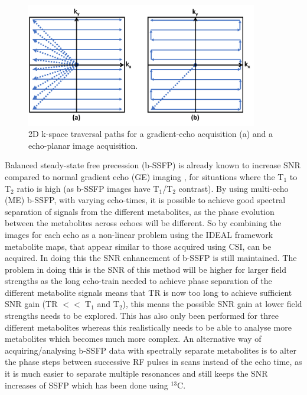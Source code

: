 \documentclass[class=article, crop=false]{standalone}
\begin{document}
\begin{figure}
    \centering
    \includegraphics[width=0.9\textwidth]{Figures/Theory/kspace.png}
    \caption{2D k-space traversal paths for a gradient-echo acquisition (a) and a echo-planar image acquisition.}
    \label{fig:theory:kspace}
\end{figure}

Balanced steady-state free precession\cite{Carr1954EffectsExperiments} (b-SSFP) is already known to increase SNR compared to normal gradient echo (GE) imaging \cite{Bieri2013FundamentalsMRI}, for situations where the T$_1$ to T$_2$ ratio is high (as b-SSFP images have T$_1$/T$_2$ contrast). By using multi-echo (ME) b-SSFP, with varying echo-times, it is possible to achieve good spectral separation of signals from the different metabolites, as the phase evolution between the metabolites across echoes will be different. So by combining the images for each echo as a non-linear problem using the IDEAL framework\cite{Reeder2007Water-fatImaging} metabolite maps, that appear similar to those acquired using CSI, can be acquired. In doing this the SNR enhancement of b-SSFP is still maintained\cite{Peters2021ImprovingInvestigation}. The problem in doing this is the SNR of this method will be higher for larger field strengths as the long echo-train needed to achieve phase separation of the different metabolite signals means that TR is now too long to achieve sufficient SNR gain (TR $<<$ T$_1$ and T$_2$), this means the possible SNR gain at lower field strengths needs to be explored. This has also only been performed for three different metabolites whereas this realistically needs to be able to analyse more metabolites which becomes much more complex. An alternative way of acquiring/analysing b-SSFP data with spectrally separate metabolites is to alter the phase steps between successive RF pulses in scans instead of the echo time, as it is much easier to separate multiple resonances and still keeps the SNR increases of SSFP which has been done using $^{13}$C\cite{Varma2016SelectiveSSFP}.
\end{document}
